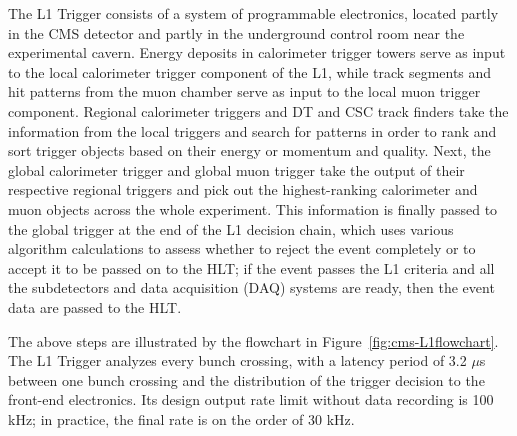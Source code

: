 The L1 Trigger consists of a system of programmable electronics, located partly in the CMS detector and partly in the underground control room near the experimental cavern. Energy deposits in calorimeter trigger towers serve as input to the local calorimeter trigger component of the L1, while track segments and hit patterns from the muon chamber serve as input to the local muon trigger component. Regional calorimeter triggers and DT and CSC track finders take the information from the local triggers and search for patterns in order to rank and sort trigger objects based on their energy or momentum and quality. Next, the global calorimeter trigger and global muon trigger take the output of their respective regional triggers and pick out the highest-ranking calorimeter and muon objects across the whole experiment. This information is finally passed to the global trigger at the end of the L1 decision chain, which uses various algorithm calculations to assess whether to reject the event completely or to accept it to be passed on to the HLT; if the event passes the L1 criteria and all the subdetectors and data acquisition (DAQ) systems are ready, then the event data are passed to the HLT.

The above steps are illustrated by the flowchart in Figure~\ref{fig:cms-L1flowchart}. The L1 Trigger analyzes every bunch crossing, with a latency period of 3.2 $\mu$s between one bunch crossing and the distribution of the trigger decision to the front-end electronics. Its design output rate limit without data recording is 100 kHz; in practice, the final rate is on the order of 30 kHz.

